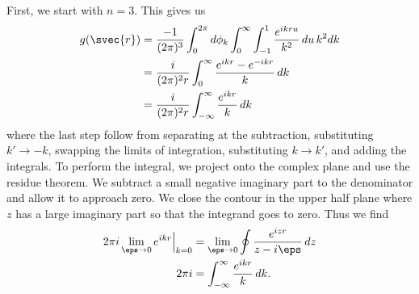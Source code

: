 \documentclass[aps,prl,reprint]{revtex4-1}
\begin{document}
First, we start with \(n=3\).  This gives us
\begin{align*}
    g(\svec{r}) &= \frac{-1}{(2\pi)^3} \int_0^{2\pi}d\phi_k
    \int_0^\infty \int_{-1}^1 \frac{e^{ikru}}{k^2} \,du \,k^2 dk \\
    &= \frac{i}{(2\pi)^2r}
    \int_0^\infty \frac{e^{ikr} -e^{-ikr}}{k} \,dk \\
    &= \frac{i}{(2\pi)^2r} \int_{-\infty}^\infty \frac{e^{ikr}}{k} \,dk
\end{align*}
where the last step follow from separating at the subtraction,
substituting \(k' \to -k\), swapping the limits of integration,
substituting \(k \to k'\), and adding the integrals.  To perform the
integral, we project onto the complex plane and use the residue
theorem.  We subtract a small negative imaginary part to the denominator
and allow it to approach zero.  We close the contour in the upper half
plane where \(z\) has a large imaginary part so that the integrand goes
to zero.  Thus we find
\begin{align*}
    2\pi i \lim_{\eps\to0} e^{ikr} \Big\rvert_{k=0} &= \lim_{\eps\to0}
    \oint \frac{e^{izr}}{z-i\eps} \,dz \\
    2\pi i&= \int_{-\infty}^\infty \frac{e^{ikr}}{k} \,dk.
\end{align*}



\end{document}
